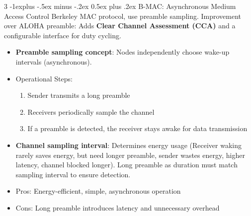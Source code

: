 \documentclass[a4paper, 9pt, landscape]{extarticle}
\makeatletter
\renewcommand{\subsection}{\@startsection{subsection}{2}{0mm}%
                                {-1explus -.5ex minus -.2ex}%
                                {0.5ex plus .2ex}%
                                {\normalfont\normalsize\bfseries}}
\makeatother
\begin{document}
\begin{multicols*}{3}
\subsection{B-MAC: Asynchronous Medium Access Control}
Berkeley MAC protocol, use preamble sampling. Improvement over ALOHA preamble: Adds \textbf{Clear Channel Assessment (CCA)} and a configurable interface for duty cycling.

\begin{itemize}
  \item \textbf{Preamble sampling concept}: Nodes independently choose wake-up intervals (asynchronous).
  \item Operational Steps:
  \begin{enumerate}
    \item Sender transmits a long preamble
    \item Receivers periodically sample the channel
    \item If a preamble is detected, the receiver stays awake for data transmission
  \end{enumerate}
  \item \textbf{Channel sampling interval}: Determines energy usage (Receiver waking rarely saves energy, but need longer preamble, sender wastes energy, higher latency, channel blocked longer). Long preamble as duration must match sampling interval to ensure detection.
  \item Pros: Energy-efficient, simple, asynchronous operation
  \item Cons: Long preamble introduces latency and unnecessary overhead
\end{itemize}


\end{multicols*}
\end{document}
